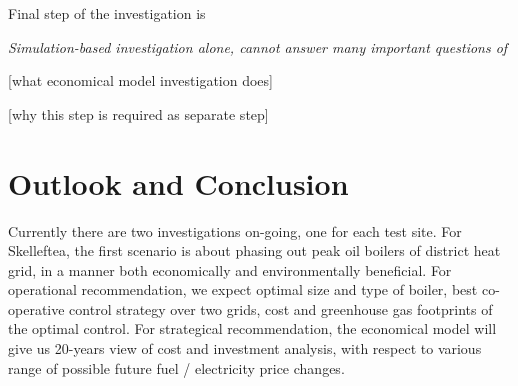 \documentclass[conference]{IEEEtran}
\begin{document}
Final step of the investigation is {\em 
Simulation-based investigation alone, cannot answer many important
questions of 


[what economical model investigation does] 

[why this step is required as separate step] 









\section{Outlook and Conclusion}
\label{sec:con} 
Currently there are two investigations on-going, one for each test
site. For Skelleftea, the first scenario is about phasing out peak oil
boilers of district heat grid, in a manner both economically and
environmentally beneficial. For operational recommendation, we expect
optimal size and type of boiler, best co-operative control strategy
over two grids, cost and greenhouse gas footprints of the optimal
control. For strategical recommendation, the economical model will
give us 20-years view of cost and investment analysis, with respect to
various range of possible future fuel / electricity price changes.  

}
\end{document}
